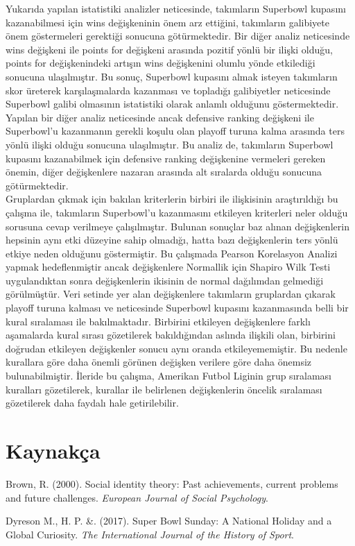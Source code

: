 \documentclass[
  12pt,
]{article}
\newlength{\cslhangindent}
\newlength{\cslentryspacingunit} %
\newenvironment{CSLReferences}[2] %
 {%
  \setlength{\parindent}{0pt}
  \ifodd #1
  \let\oldpar\par
  \def\par{\hangindent=\cslhangindent\oldpar}
  \fi
  \setlength{\parskip}{#2\cslentryspacingunit}
 }%
 {}
\begin{document}
Yukarıda yapılan istatistiki analizler neticesinde, takımların Superbowl kupasını kazanabilmesi için wins değişkeninin önem arz ettiğini, takımların galibiyete önem göstermeleri gerektiği sonucuna götürmektedir.
Bir diğer analiz neticesinde wins değişkeni ile points for değişkeni arasında pozitif yönlü bir ilişki olduğu, points for değişkenindeki artışın wins değişkenini olumlu yönde etkilediği sonucuna ulaşılmıştır. Bu sonuç, Superbowl kupasını almak isteyen takımların skor üreterek karşılaşmalarda kazanması ve topladığı galibiyetler neticesinde Superbowl galibi olmasının istatistiki olarak anlamlı olduğunu göstermektedir.
Yapılan bir diğer analiz neticesinde ancak defensive ranking değişkeni ile Superbowl'u kazanmanın gerekli koşulu olan playoff turuna kalma arasında ters yönlü ilişki olduğu sonucuna ulaşılmıştır. Bu analiz de, takımların Superbowl kupasını kazanabilmek için defensive ranking değişkenine vermeleri gereken önemin, diğer değişkenlere nazaran arasında alt sıralarda olduğu sonucuna götürmektedir.\\
Gruplardan çıkmak için bakılan kriterlerin birbiri ile ilişkisinin araştırıldığı bu çalışma ile, takımların Superbowl'u kazanmasını etkileyen kriterleri neler olduğu sorusuna cevap verilmeye çalışılmıştır. Bulunan sonuçlar baz alınan değişkenlerin hepsinin aynı etki düzeyine sahip olmadığı, hatta bazı değişkenlerin ters yönlü etkiye neden olduğunu göstermiştir.
Bu çalışmada Pearson Korelasyon Analizi yapmak hedeflenmiştir ancak değişkenlere Normallik için Shapiro Wilk Testi uygulandıktan sonra değişkenlerin ikisinin de normal dağılımdan gelmediği görülmüştür.
Veri setinde yer alan değişkenlere takımların gruplardan çıkarak playoff turuna kalması ve neticesinde Superbowl kupasını kazanmasında belli bir kural sıralaması ile bakılmaktadır. Birbirini etkileyen değişkenlere farklı aşamalarda kural sırası gözetilerek bakıldığından aslında ilişkili olan, birbirini doğrudan etkileyen değişkenler sonucu aynı oranda etkileyememiştir. Bu nedenle kurallara göre daha önemli görünen değişken verilere göre daha önemsiz bulunabilmiştir. İleride bu çalışma, Amerikan Futbol Liginin grup sıralaması kuralları gözetilerek, kurallar ile belirlenen değişkenlerin öncelik sıralaması gözetilerek daha faydalı hale getirilebilir.

\newpage

\hypertarget{references}{%
\section{Kaynakça}\label{references}}

\hypertarget{refs}{}
\begin{CSLReferences}{1}{0}
\leavevmode{}%
Brown, R. (2000). Social identity theory: Past achievements, current problems and future challenges. \emph{European Journal of Social Psychology}.

\leavevmode{}%
Dyreson M., H. P. \&. (2017). Super Bowl Sunday: A National Holiday and a Global Curiosity. \emph{The International Journal of the History of Sport}.

\end{CSLReferences}
\end{document}
